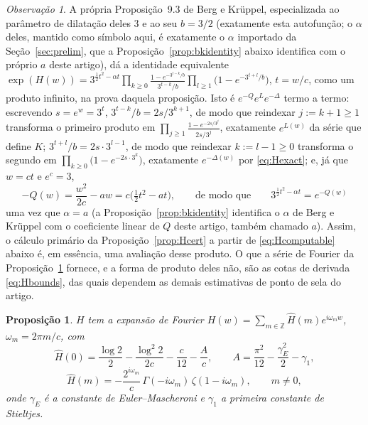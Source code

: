 \documentclass[11pt]{amsart}
\theoremstyle{plain}
\newtheorem{proposition}[theorem]{Proposição}
\theoremstyle{definition}
\theoremstyle{remark}
\newtheorem{remark}[theorem]{Observação}
\newcommand{\Z}{\mathbb{Z}}
\begin{document}
\begin{remark}
\label{rem:bkproduct}
A própria Proposição~9.3 de Berg e Kr\"uppel, especializada ao parâmetro de dilatação deles $3$ e
ao seu $b=3/2$ (exatamente esta autofunção; o $\alpha$ deles, mantido como símbolo aqui, é
exatamente o $\alpha$ importado da Seção~\ref{sec:prelim}, que a Proposição~\ref{prop:bkidentity}
abaixo identifica com o próprio $a$ deste artigo), dá a identidade equivalente
$\exp(H(w)) = 3^{\frac12 t^2 - \alpha t} \prod_{k\ge0}\frac{1-e^{-3^{t-k}/b}}{3^{t-k}/b}
\prod_{l\ge1}\bigl(1-e^{-3^{t+l}/b}\bigr)$, $t=w/c$, como um produto infinito, na prova daquela
proposição. Isto é $e^{-Q}e^Le^{-\Delta}$ termo a termo: escrevendo $s=e^w=3^t$, $3^{t-k}/b =
2s/3^{k+1}$, de modo que reindexar $j:=k+1\ge1$ transforma o primeiro produto em
$\prod_{j\ge1}\frac{1-e^{-2s/3^j}}{2s/3^j}$, exatamente $e^{L(w)}$ da série que define $K$;
$3^{t+l}/b = 2s\cdot3^{l-1}$, de modo que reindexar $k:=l-1\ge0$ transforma o segundo em
$\prod_{k\ge0}\bigl(1-e^{-2s\cdot3^k}\bigr)$, exatamente $e^{-\Delta(w)}$ por \eqref{eq:Hexact}; e,
já que $w=ct$ e $e^c=3$,
\[
-Q(w) = \frac{w^2}{2c}-aw = c\bigl(\tfrac12t^2-at\bigr), \qquad\text{de modo que}\qquad
3^{\frac12t^2-\alpha t} = e^{-Q(w)}
\]
uma vez que $\alpha=a$ (a Proposição~\ref{prop:bkidentity} identifica o $\alpha$ de Berg e
Kr\"uppel com o coeficiente linear de $Q$ deste artigo, também chamado $a$). Assim, o cálculo
primário da Proposição~\ref{prop:Hcert} a partir de \eqref{eq:Hcomputable} abaixo é, em essência,
uma avaliação desse produto. O que a série de Fourier da Proposição~\ref{prop:Hfourier} fornece, e
a forma de produto deles não, são as cotas de derivada \eqref{eq:Hbounds}, das quais dependem as
demais estimativas de ponto de sela do artigo.
\end{remark}

\begin{proposition}
\label{prop:Hfourier}
$H$ tem a expansão de Fourier $H(w) = \sum_{m\in\Z} \hat H(m) e^{i\omega_m w}$, $\omega_m =
2\pi m/c$, com
\[
\hat H(0) = \frac{\log 2}{2} - \frac{\log^2 2}{2c} - \frac{c}{12} - \frac{A}{c}, \qquad
A = \frac{\pi^2}{12} - \frac{\gamma_E^2}{2} - \gamma_1,
\]
\[
\hat H(m) = -\frac{2^{i\omega_m}}{c}\, \Gamma(-i\omega_m)\, \zeta(1-i\omega_m), \qquad m \ne 0,
\]
onde $\gamma_E$ é a constante de Euler--Mascheroni e $\gamma_1$ a primeira constante de Stieltjes.
\end{proposition}
\end{document}
